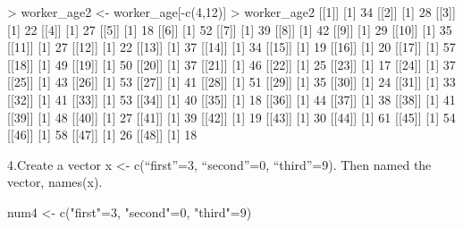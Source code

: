 \documentclass[
]{article}
\newenvironment{Shaded}{\begin{snugshade}}{\end{snugshade}}
\newcommand{\NormalTok}[1]{#1}
\begin{document}
\begin{Shaded}
\begin{Highlighting}[]
\NormalTok{\textgreater{} worker\_age2 \textless{}{-} worker\_age[{-}c(4,12)]}
\NormalTok{\textgreater{} worker\_age2}
\NormalTok{[[1]]}
\NormalTok{[1] 34}
\NormalTok{[[2]]}
\NormalTok{[1] 28}
\NormalTok{[[3]]}
\NormalTok{[1] 22}
\NormalTok{[[4]]}
\NormalTok{[1] 27}
\NormalTok{[[5]]}
\NormalTok{[1] 18}
\NormalTok{[[6]]}
\NormalTok{[1] 52}
\NormalTok{[[7]]}
\NormalTok{[1] 39}
\NormalTok{[[8]]}
\NormalTok{[1] 42}
\NormalTok{[[9]]}
\NormalTok{[1] 29}
\NormalTok{[[10]]}
\NormalTok{[1] 35}
\NormalTok{[[11]]}
\NormalTok{[1] 27}
\NormalTok{[[12]]}
\NormalTok{[1] 22}
\NormalTok{[[13]]}
\NormalTok{[1] 37}
\NormalTok{[[14]]}
\NormalTok{[1] 34}
\NormalTok{[[15]]}
\NormalTok{[1] 19}
\NormalTok{[[16]]}
\NormalTok{[1] 20}
\NormalTok{[[17]]}
\NormalTok{[1] 57}
\NormalTok{[[18]]}
\NormalTok{[1] 49}
\NormalTok{[[19]]}
\NormalTok{[1] 50}
\NormalTok{[[20]]}
\NormalTok{[1] 37}
\NormalTok{[[21]]}
\NormalTok{[1] 46}
\NormalTok{[[22]]}
\NormalTok{[1] 25}
\NormalTok{[[23]]}
\NormalTok{[1] 17}
\NormalTok{[[24]]}
\NormalTok{[1] 37}
\NormalTok{[[25]]}
\NormalTok{[1] 43}
\NormalTok{[[26]]}
\NormalTok{[1] 53}
\NormalTok{[[27]]}
\NormalTok{[1] 41}
\NormalTok{[[28]]}
\NormalTok{[1] 51}
\NormalTok{[[29]]}
\NormalTok{[1] 35}
\NormalTok{[[30]]}
\NormalTok{[1] 24}
\NormalTok{[[31]]}
\NormalTok{[1] 33}
\NormalTok{[[32]]}
\NormalTok{[1] 41}
\NormalTok{[[33]]}
\NormalTok{[1] 53}
\NormalTok{[[34]]}
\NormalTok{[1] 40}
\NormalTok{[[35]]}
\NormalTok{[1] 18}
\NormalTok{[[36]]}
\NormalTok{[1] 44}
\NormalTok{[[37]]}
\NormalTok{[1] 38}
\NormalTok{[[38]]}
\NormalTok{[1] 41}
\NormalTok{[[39]]}
\NormalTok{[1] 48}
\NormalTok{[[40]]}
\NormalTok{[1] 27}
\NormalTok{[[41]]}
\NormalTok{[1] 39}
\NormalTok{[[42]]}
\NormalTok{[1] 19}
\NormalTok{[[43]]}
\NormalTok{[1] 30}
\NormalTok{[[44]]}
\NormalTok{[1] 61}
\NormalTok{[[45]]}
\NormalTok{[1] 54}
\NormalTok{[[46]]}
\NormalTok{[1] 58}
\NormalTok{[[47]]}
\NormalTok{[1] 26}
\NormalTok{[[48]]}
\NormalTok{[1] 18}
\end{Highlighting}
\end{Shaded}

4.Create a vector x \textless- c(``first''=3, ``second''=0,
``third''=9). Then named the vector, names(x).

\begin{Shaded}
\begin{Highlighting}[]
\NormalTok{num4 \textless{}{-} c("first"=3, "second"=0, "third"=9)}
 
\end{Highlighting}
\end{Shaded}
\end{document}
